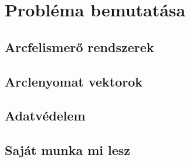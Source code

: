 
\section{Probléma bemutatása}

\subsection{Arcfelismerő rendszerek}

\subsection{Arclenyomat vektorok}

\subsection{Adatvédelem}

\subsection{Saját munka mi lesz}
\newpage
